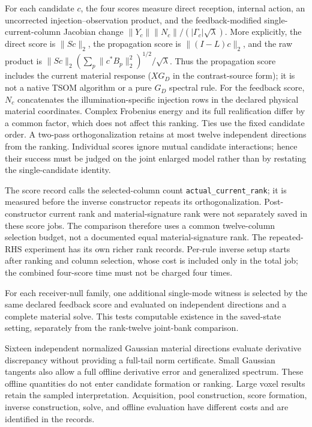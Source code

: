 For each candidate $c$, the four scores measure direct reception, internal action, an uncorrected injection--observation product, and the feedback-modified single-current-column Jacobian change $\|Y_c\|\|N_c\|/(|\Gamma_c|\sqrt\lambda)$. More explicitly, the direct score is $\|Sc\|_2$, the propagation score is $\|(I-L)c\|_2$, and the raw product is $\|Sc\|_2(\sum_p\|c^*B_p\|_2^2)^{1/2}/\sqrt\lambda$. Thus the propagation score includes the current material response ($XG_D$ in the contrast-source form); it is not a native TSOM algorithm or a pure $G_D$ spectral rule. For the feedback score, $N_c$ concatenates the illumination-specific injection rows in the declared physical material coordinates. Complex Frobenius energy and its full realification differ by a common factor, which does not affect this ranking. Ties use the fixed candidate order. A two-pass orthogonalization retains at most twelve independent directions from the ranking. Individual scores ignore mutual candidate interactions; hence their success must be judged on the joint enlarged model rather than by restating the single-candidate identity.

The score record calls the selected-column count \texttt{actual\_current\_rank}; it is measured before the inverse constructor repeats its orthogonalization. Post-constructor current rank and material-signature rank were not separately saved in these score jobs. The comparison therefore uses a common twelve-column selection budget, not a documented equal material-signature rank. The repeated-RHS experiment has its own richer rank records. Per-rule inverse setup starts after ranking and column selection, whose cost is included only in the total job; the combined four-score time must not be charged four times.

For each receiver-null family, one additional single-mode witness is selected by the same declared feedback score and evaluated on independent directions and a complete material solve. This tests computable existence in the saved-state setting, separately from the rank-twelve joint-bank comparison.

Sixteen independent normalized Gaussian material directions evaluate derivative discrepancy without providing a full-tail norm certificate. Small Gaussian tangents also allow a full offline derivative error and generalized spectrum. These offline quantities do not enter candidate formation or ranking. Large voxel results retain the sampled interpretation. Acquisition, pool construction, score formation, inverse construction, solve, and offline evaluation have different costs and are identified in the records.

